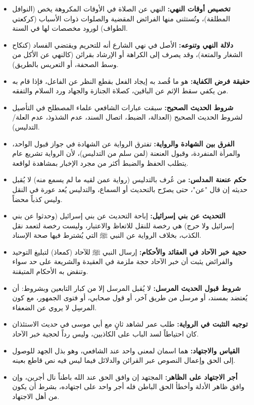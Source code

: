 \begin{itemize}
    \item \textbf{تخصيص أوقات النهي:} النهي عن الصلاة في الأوقات المكروهة يخص (النوافل المطلقة)، وتُستثنى منها الفرائض المقضية والصلوات ذوات الأسباب (كركعتي الطواف) لورود مخصصات لها في السنة.
    \item \textbf{دلالة النهي وتنوعه:} الأصل في نهي الشارع أنه للتحريم ويقتضي الفساد (كنكاح الشغار والمتعة)، وقد يصرف إلى الكراهة أو الإرشاد بقرائن (كالنهي عن الأكل من وسط الصحفة، أو التعريس بالطريق).
    \item \textbf{حقيقة فرض الكفاية:} هو ما قُصد به إيجاد الفعل بقطع النظر عن الفاعل، فإذا قام به من يكفي سقط الإثم عن الباقين، كصلاة الجنازة والجهاد ورد السلام والتفقه.
    \item \textbf{شروط الحديث الصحيح:} سبقت عبارات الشافعي علماء المصطلح في التأصيل لشروط الحديث الصحيح (العدالة، الضبط، اتصال السند، عدم الشذوذ، عدم العلة/التدليس).
    \item \textbf{الفرق بين الشهادة والرواية:} تفترق الرواية عن الشهادة في جواز قبول الواحد، والمرأة المنفردة، وقبول العنعنة (لمن سلم من التدليس)، لأن الرواية تشريع عام يتطلب الحفظ والضبط أكثر من مجرد الإخبار بمشاهدة لواقعة.
    \item \textbf{حكم عنعنة المدلس:} من عُرف بالتدليس (رواية عمن لقيه ما لم يسمع منه) لا يُقبل حديثه إن قال "عن"، حتى يصرّح بالتحديث أو السماع، والتدليس يُعد عورة في النقل وليس كذباً محضاً.
    \item \textbf{التحديث عن بني إسرائيل:} إباحة التحديث عن بني إسرائيل (وحدثوا عن بني إسرائيل ولا حرج) هي رخصة للنقل للاتعاظ والاعتبار، وليست رخصة لتعمد نقل الكذب، بخلاف الرواية عن النبي ﷺ التي يُشترط فيها صحة الإسناد.
    \item \textbf{حجية خبر الآحاد في العقائد والأحكام:} إرسال النبي ﷺ للآحاد (كمعاذ) لتبليغ التوحيد والفرائض يثبت أن خبر الآحاد حجة ملزمة في العقيدة والشريعة على حد سواء وتنقض به الأحكام المتيقنة.
    \item \textbf{شروط قبول الحديث المرسل:} لا يُقبل المرسل إلا من كبار التابعين وبشروط: أن يُعتضد بمسند، أو مرسل من طريق آخر، أو قول صحابي، أو فتوى الجمهور، مع كون المرسِل لا يروي عن الضعفاء.
    \item \textbf{توجيه التثبت في الرواية:} طلب عمر لشاهد ثانٍ مع أبي موسى في حديث الاستئذان كان احتياطاً لسد الباب على الكاذبين، وليس رداً لحجية خبر الآحاد.
    \item \textbf{القياس والاجتهاد:} هما اسمان لمعنى واحد عند الشافعي، وهو بذل الجهد للوصول إلى الحق وإعمال النصوص عبر القرائن والدلائل فيما ليس فيه نص قاطع بعينه.
    \item \textbf{أجر الاجتهاد على الظاهر:} المجتهد إن وافق الحق عند الله باطناً نال أجرين، وإن وافق ظاهر الأدلة وأخطأ الحق الباطن فله أجر واحد على اجتهاده، بشرط أن يكون من أهل الاجتهاد.

\end{itemize}
